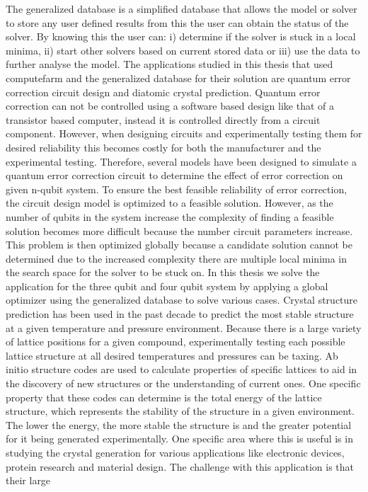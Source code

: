 The generalized database is a simplified database that allows the model or solver to store any user defined results from this the user can obtain the status of the solver. By knowing this the user can: i) determine if the solver is stuck in a local minima, ii) start other solvers based on current stored data or iii) use the data to further analyse the model. 
The applications studied in this thesis that used computefarm and the generalized database for their solution are quantum error correction circuit design and diatomic crystal prediction. 
Quantum error correction can not be controlled using a software based design like that of a transistor based computer, instead it is controlled directly from a circuit component. However, when designing circuits and experimentally testing them for desired reliability this becomes costly for both the manufacturer and the experimental testing. Therefore, several models have been designed to simulate a quantum error correction circuit to determine the effect of error correction on given n-qubit system. To ensure the best feasible
reliability of error correction, the circuit design model is optimized to a feasible solution. However, as the number of qubits in the system increase the complexity of finding a feasible solution becomes more difficult because the number circuit parameters increase. This problem is then optimized globally because a candidate solution cannot be determined due to the increased complexity there are multiple local minima in the search space for the solver to be stuck on. In this thesis we
solve the application for the three qubit and four qubit system by applying a global optimizer using the generalized database to solve various cases. 
Crystal structure prediction has been used in the past decade to predict the most stable structure at a given temperature and pressure environment. Because there is a large variety of lattice positions for a given compound, experimentally testing each possible lattice structure at all desired temperatures and pressures can be taxing. Ab initio structure codes are used to calculate properties of specific lattices to aid in the discovery of new structures or the understanding of current
ones. One specific property that these codes can determine is the total energy of the lattice structure, which represents the stability of the structure in a given environment. The lower the energy, the more stable the structure is and the greater potential for it being generated experimentally. One specific area where this is useful is in studying the crystal generation for various applications like electronic devices, protein research and material design. The challenge with this application is that their large
